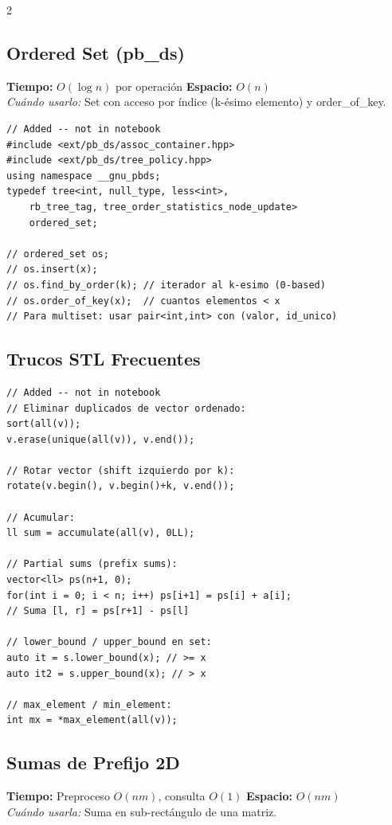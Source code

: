 \documentclass[10pt,a4paper]{article}
\begin{document}
\begin{multicols}{2}
\subsection{Ordered Set (pb\_ds)}
\textbf{Tiempo:} $O(\log n)$ por operaci\'on \quad \textbf{Espacio:} $O(n)$\\
\textit{Cu\'ando usarlo:} Set con acceso por \'indice (k-\'esimo elemento) y order\_of\_key.

\begin{lstlisting}
// Added -- not in notebook
#include <ext/pb_ds/assoc_container.hpp>
#include <ext/pb_ds/tree_policy.hpp>
using namespace __gnu_pbds;
typedef tree<int, null_type, less<int>,
    rb_tree_tag, tree_order_statistics_node_update>
    ordered_set;

// ordered_set os;
// os.insert(x);
// os.find_by_order(k); // iterador al k-esimo (0-based)
// os.order_of_key(x);  // cuantos elementos < x
// Para multiset: usar pair<int,int> con (valor, id_unico)
\end{lstlisting}

\subsection{Trucos STL Frecuentes}
\begin{lstlisting}
// Added -- not in notebook
// Eliminar duplicados de vector ordenado:
sort(all(v));
v.erase(unique(all(v)), v.end());

// Rotar vector (shift izquierdo por k):
rotate(v.begin(), v.begin()+k, v.end());

// Acumular:
ll sum = accumulate(all(v), 0LL);

// Partial sums (prefix sums):
vector<ll> ps(n+1, 0);
for(int i = 0; i < n; i++) ps[i+1] = ps[i] + a[i];
// Suma [l, r] = ps[r+1] - ps[l]

// lower_bound / upper_bound en set:
auto it = s.lower_bound(x); // >= x
auto it2 = s.upper_bound(x); // > x

// max_element / min_element:
int mx = *max_element(all(v));
\end{lstlisting}

\subsection{Sumas de Prefijo 2D}
\textbf{Tiempo:} Preproceso $O(nm)$, consulta $O(1)$ \quad \textbf{Espacio:} $O(nm)$\\
\textit{Cu\'ando usarla:} Suma en sub-rect\'angulo de una matriz.


\end{multicols}
\end{document}
